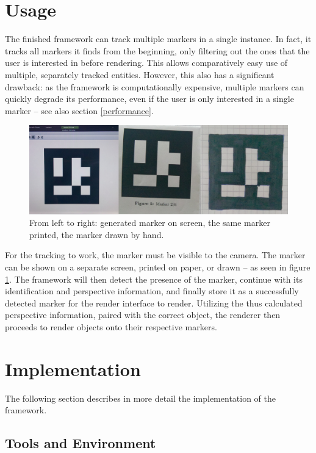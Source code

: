 \section{Usage}

The finished framework can track multiple markers in a single instance.
In fact, it tracks all markers it finds from the beginning, only filtering out the ones that the user is interested in before rendering.
This allows comparatively easy use of multiple, separately tracked entities.
However, this also has a significant drawback: as the framework is computationally expensive, multiple markers can quickly degrade its performance, even if the user is only interested in a single marker – see also section \ref{performance}.

\begin{figure}[H]
	\centering
	\includegraphics[width=12cm]{img/mult_marker.png}
	\caption[Complete Class Diagram]{From left to right: generated marker on screen, the same marker printed, the marker drawn by hand.}
	\label{fig:mult_markers}
\end{figure}

For the tracking to work, the marker must be visible to the camera.
The marker can be shown on a separate screen, printed on paper, or drawn – as seen in figure \ref{fig:mult_markers}.
The framework will then detect the presence of the marker, continue with its identification and perspective information, and finally store it as a successfully detected marker for the render interface to render.
Utilizing the thus calculated perspective information, paired with the correct object, the renderer then proceeds to render objects onto their respective markers.

\section{Implementation}

The following section describes in more detail the implementation of the framework.

\subsection{Tools and Environment}

